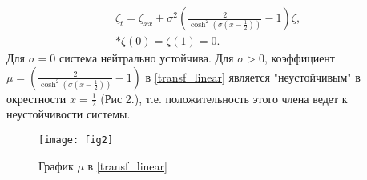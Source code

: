 \begin{gather} \label{transf_linear}
    \zeta_t = \zeta_{xx} + \sigma^2 \left( \frac{2}{\cosh^2(\sigma(x -
    \frac{1}{2}))} - 1 \right) \zeta, \\* 
    \zeta(0) = \zeta(1) = 0.
\end{gather}
Для $\sigma = 0$ система нейтрально устойчива. Для $\sigma > 0$, коэффициент 
$\mu = \left(\frac{2}{\cosh^2(\sigma(x - \frac{1}{2}))} - 1 \right)$  в 
\eqref{transf_linear} является "неустойчивым" в окрестности 
$x = \frac{1}{2}$ (Рис 2.), т.е. положительность этого члена ведет к
неустойчивости системы.


\begin{figure}[H]
    \centering
    \texttt{[image: fig2]}
    \caption{График $\mu$ в \eqref{transf_linear}}
\end{figure}
